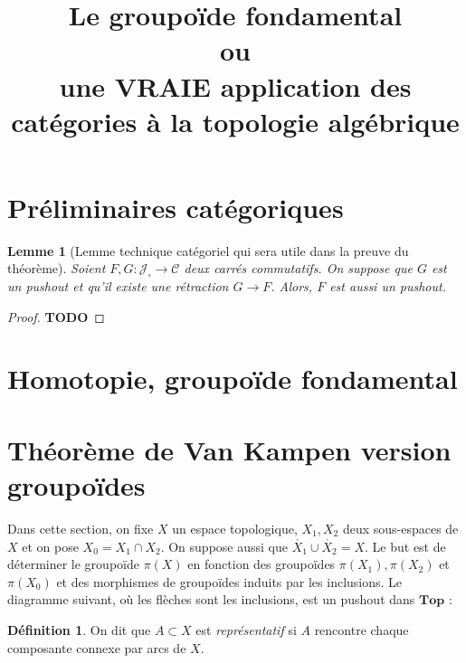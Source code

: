\documentclass{article}
\title{Le groupoïde fondamental \\ {\small ou} \\ une VRAIE application des catégories à la topologie algébrique}
\author{}
\date{}
\newcommand{\cat}{\mathcal{C}}
\newcommand{\Jcat}{\mathcal{J}}
\newcommand{\Top}{\mathbf{Top}}
\newtheorem{lemma}[theorem]{Lemme}
\theoremstyle{definition}
\newtheorem{definition}[theorem]{Définition}
\theoremstyle{remark}
\newcommand{\todo}{\textbf{TODO}}
\begin{document}
\maketitle

\section{Préliminaires catégoriques}

\begin{lemma}[Lemme technique catégoriel qui sera utile dans la preuve du théorème] \label{lemmeretraction}
    Soient $F,G : \Jcat_\square \to \cat$ deux carrés commutatifs. On suppose que $G$ est un pushout et qu'il existe une rétraction $G \to F$. Alors, $F$ est aussi un pushout.
\end{lemma}

\begin{proof}
    \todo
\end{proof}

\section{Homotopie, groupoïde fondamental}

\section{Théorème de Van Kampen version groupoïdes}

Dans cette section, on fixe $X$ un espace topologique, $X_1,X_2$ deux sous-espaces de $X$ et on pose $X_0 = X_1 \cap X_2$. On suppose aussi que $\mathring{X_1} \cup \mathring{X_2} = X$. Le but est de déterminer le groupoïde $\pi(X)$ en fonction des groupoïdes $\pi(X_1),\pi(X_2)$ et $\pi(X_0)$ et des morphismes de groupoïdes induits par les inclusions. Le diagramme suivant, où les flèches sont les inclusions, est un pushout dans $\Top$ :
\begin{center}
\end{center}

\begin{definition}
    On dit que $A \subset X$ est \emph{représentatif} si $A$ rencontre chaque composante connexe par arcs de $X$.
\end{definition}
\end{document}
